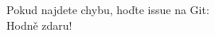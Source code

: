 \documentclass[a4paper, 11pt]{article}
\begin{document}
Pokud najdete chybu, hoďte issue na Git: \\

\rm Hodně zdaru!

\vspace{2em}

\clearpage{\pagestyle{empty}}



\newpage
\parskip=0pt
\begin{small}
\tableofcontents
\end{small}
\parskip=7pt
\newpage








\end{document}
